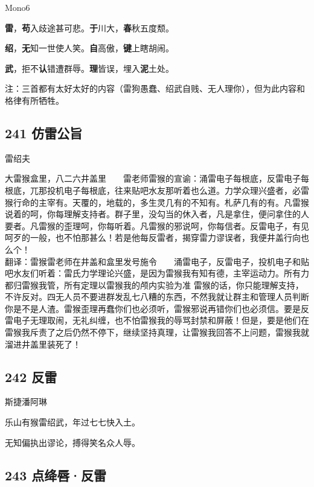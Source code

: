 {Mono6}

\textbf{雷}，\textbf{苟}入歧途甚可悲。\textbf{于}川大，\textbf{春}秋五度颓。

\textbf{绍}，\textbf{无}知一世使人笑。\textbf{自}高傲，\textbf{键}上瞎胡闹。

\textbf{武}，拒不\textbf{认}错遭群辱。\textbf{理}皆误，埋入\textbf{泥}土处。

注：三首都有太好太好的内容（雷狗愚蠢、绍武自贱、无人理你），但为此内容和格律有所牺牲。

\hypertarget{ux4effux96f7ux516cux65e8}{%
\subsection{241 仿雷公旨}\label{ux4effux96f7ux516cux65e8}}

{雷绍夫}

大雷猴盒里，八二六井盖里~~~~雷老师雷猴的宣谕：涌雷电子每根底，反雷电子每根底，兀那投机电子每根底，往来贴吧水友那听着也么道。力学众理兴盛者，必雷猴行命的主宰有。天覆的，地载的，多生灵几有的不知有。札萨几有的有。凡雷猴说着的呵，你每理解支持者。群子里，没勾当的休入者，凡是拿住，便问拿住的人要者。凡雷猴的歪理呵，你每听着。凡雷猴的邪说呵，你每信者。反雷电子，有见呵歹的一般，也不怕那甚么！若是他每反雷者，揭穿雷力谬误者，我便井盖行向也么个！
~\\
翻译：雷猴雷老师在井盖和盒里发号施令~~~~涌雷电子，反雷电子，投机电子和贴吧水友们听着：雷氏力学理论兴盛，是因为雷猴我有知有德，主宰运动力。所有力都归雷猴我管，所有定理以雷猴我的颅内实验为准
雷猴的话，你只能理解支持，不许反对。四无人员不要进群发乱七八糟的东西，不然我就让群主和管理人员判断你是不是人渣。雷猴歪理再蠢你们也必须听，雷猴邪说再错你们也必须信。要是反雷电子无理取闹，无礼纠缠，也不怕雷猴我的辱骂封禁和屏蔽！但是，要是他们在雷猴我斥责了之后仍然不停下，继续坚持真理，让雷猴我回答不上问题，雷猴我就溜进井盖里装死了！

\hypertarget{ux53cdux96f7-8}{%
\subsection{242 反雷}\label{ux53cdux96f7-8}}

{斯捷潘阿琳}

乐山有猴雷绍武，年过七七快入土。

无知偏执出谬论，搏得笑名众人辱。

\hypertarget{ux70b9ux7edbux5507ux53cdux96f7-1}{%
\subsection{243 点绛唇·反雷}\label{ux70b9ux7edbux5507ux53cdux96f7-1}}

